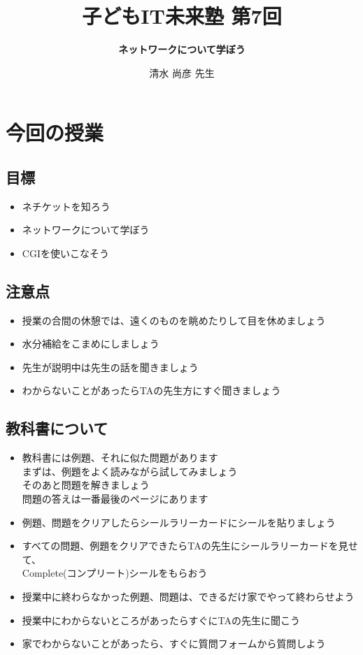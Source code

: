 \documentclass[a4paper,12pt,dvipdfmx]{jarticle}
\title{\vspace{70mm}\Huge 子どもIT未来塾 第7回}
\author{
\huge\bf ネットワークについて学ぼう
\vspace{15mm}
}
\date{%
\Huge 清水 尚彦 先生
}
\begin{document}


\maketitle

\thispagestyle{FirstPage}
\clearpage\section{今回の授業}

\subsection*{目標}
\begin{itemize}
	\item ネチケットを知ろう
	\item ネットワークについて学ぼう
	\item CGIを使いこなそう
\end{itemize}

\subsection*{注意点}
\begin{itemize}
	\item 授業の合間の休憩では、遠くのものを眺めたりして目を休めましょう
	\item 水分補給をこまめにしましょう
	\item 先生が説明中は先生の話を聞きましょう
	\item わからないことがあったらTAの先生方にすぐ聞きましょう
\end{itemize}

\subsection*{教科書について}
\begin{itemize}
	\item 教科書には例題、それに似た問題があります\\
	      まずは、例題をよく読みながら試してみましょう\\
	      そのあと問題を解きましょう\\
	      問題の答えは一番最後のページにあります
	\item 例題、問題をクリアしたらシールラリーカードにシールを貼りましょう
	\item すべての問題、例題をクリアできたらTAの先生にシールラリーカードを見せて、\\
	      Complete(コンプリート)シールをもらおう
	\item 授業中に終わらなかった例題、問題は、できるだけ家でやって終わらせよう
	\item 授業中にわからないところがあったらすぐにTAの先生に聞こう
	\item 家でわからないことがあったら、すぐに質問フォームから質問しよう
\end{itemize}
\end{document}
